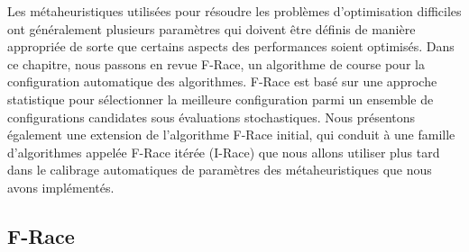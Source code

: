 \documentclass[12pt]{article}
\begin{document}
    Les métaheuristiques utilisées pour résoudre les problèmes d'optimisation difficiles ont généralement plusieurs paramètres qui doivent être définis de manière appropriée de sorte que certains aspects des performances soient optimisés. Dans ce chapitre, nous passons en revue F-Race, un algorithme de course pour la configuration automatique des algorithmes. F-Race est basé sur une approche statistique pour sélectionner la meilleure configuration parmi un ensemble de configurations candidates sous évaluations stochastiques. Nous présentons également une extension de l'algorithme F-Race initial, qui conduit à une famille d'algorithmes appelée F-Race itérée (I-Race) que nous allons utiliser plus tard dans le calibrage automatiques de paramètres des métaheuristiques que nous avons implémentés. 
    \subsection{F-Race}
\end{document}
